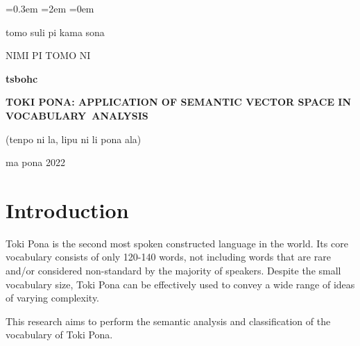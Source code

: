 \documentclass[14pt, a4paper]{extreport}
\begin{document}
\sloppy
{}\font=0.3em %
\font=2em %
\font=0em %

\begin{titlepage}
  \begin{center}
    tomo suli pi kama sona

    NIMI PI TOMO NI

    \vfill

    \textbf{tsbohc}

    \large
    \textbf{TOKI PONA: APPLICATION OF SEMANTIC VECTOR SPACE IN VOCABULARY~ANALYSIS}

    \normalsize

    \bigskip
    (tenpo ni la, lipu ni li pona ala) 

    \bigskip


    \vfill
    ma pona 2022

  \end{center}
\end{titlepage}

\setcounter{page}{2}
\restoregeometry

\renewcommand{\contentsname}{\let\clearpage\relax\chapter*{Contents}} %
\tableofcontents




\chapter{Introduction}

Toki Pona is the second most spoken constructed language in the world. Its core vocabulary consists of only 120-140 words, not including words that are rare and/or considered non-standard by the majority of speakers. Despite the small vocabulary size, Toki Pona can be effectively used to convey a wide range of ideas of varying complexity.

This research aims to perform the semantic analysis and classification of the vocabulary of Toki Pona.

\end{document}
